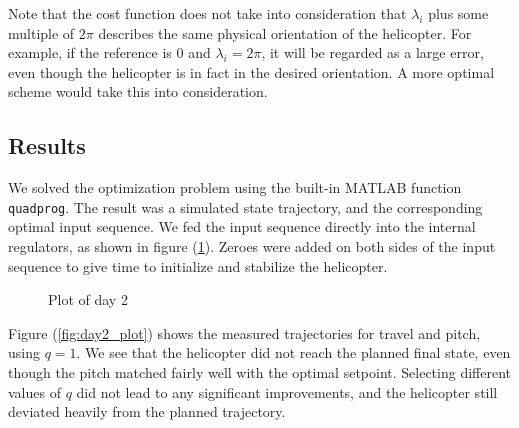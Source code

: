 Note that the cost function does not take into consideration that $\lambda_i$ plus some multiple of $2\pi$ describes the same physical orientation of the helicopter. For example, if the reference is $0$ and $\lambda_i = 2\pi$, it will be regarded as a large error, even though the helicopter is in fact in the desired orientation. A more optimal scheme would take this into consideration.

\subsection{Results}

We solved the optimization problem using the built-in MATLAB function \texttt{quadprog}. The result was a simulated state trajectory, and the corresponding optimal input sequence. We fed the input sequence directly into the internal regulators, as shown in figure (\ref{fig:day2_mdl}). Zeroes were added on both sides of the input sequence to give time to initialize and stabilize the helicopter.

\begin{figure}[htb]
    \centering
    \caption{Plot of day 2}
    \label{fig:day2_mdl}
\end{figure}

Figure (\ref{fig:day2_plot}) shows the measured trajectories for travel and pitch, using $q = 1$. We see that the helicopter did not reach the planned final state, even though the pitch matched fairly well with the optimal setpoint. Selecting different values of $q$ did not lead to any significant improvements, and the helicopter still deviated heavily from the planned trajectory.

